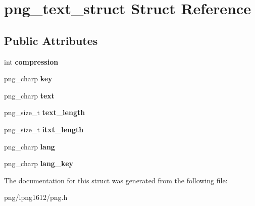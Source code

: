 \hypertarget{structpng__text__struct}{\section{png\+\_\+text\+\_\+struct Struct Reference}
\label{structpng__text__struct}
}
\subsection*{Public Attributes}
\begin{DoxyCompactItemize}
\item 
\hypertarget{structpng__text__struct_ad09c73bc91f014ad352abfbb3b61b8d1}{int {\bfseries compression}}\label{structpng__text__struct_ad09c73bc91f014ad352abfbb3b61b8d1}

\item 
\hypertarget{structpng__text__struct_a99c3063a15889d2fc242f24b69c567ef}{png\+\_\+charp {\bfseries key}}\label{structpng__text__struct_a99c3063a15889d2fc242f24b69c567ef}

\item 
\hypertarget{structpng__text__struct_a27492227bc525bee14abcc8002084edd}{png\+\_\+charp {\bfseries text}}\label{structpng__text__struct_a27492227bc525bee14abcc8002084edd}

\item 
\hypertarget{structpng__text__struct_a26312284ecc7a95e2168a29d0170b411}{png\+\_\+size\+\_\+t {\bfseries text\+\_\+length}}\label{structpng__text__struct_a26312284ecc7a95e2168a29d0170b411}

\item 
\hypertarget{structpng__text__struct_aca3fd6fec58f54460d57ad07182d570d}{png\+\_\+size\+\_\+t {\bfseries itxt\+\_\+length}}\label{structpng__text__struct_aca3fd6fec58f54460d57ad07182d570d}

\item 
\hypertarget{structpng__text__struct_a803048cbecc84ca530d64db6513f4fc6}{png\+\_\+charp {\bfseries lang}}\label{structpng__text__struct_a803048cbecc84ca530d64db6513f4fc6}

\item 
\hypertarget{structpng__text__struct_a61ee3cba011cf3bdefda49f8f9885482}{png\+\_\+charp {\bfseries lang\+\_\+key}}\label{structpng__text__struct_a61ee3cba011cf3bdefda49f8f9885482}

\end{DoxyCompactItemize}


The documentation for this struct was generated from the following file\+:\begin{DoxyCompactItemize}
\item 
png/lpng1612/png.\+h\end{DoxyCompactItemize}
